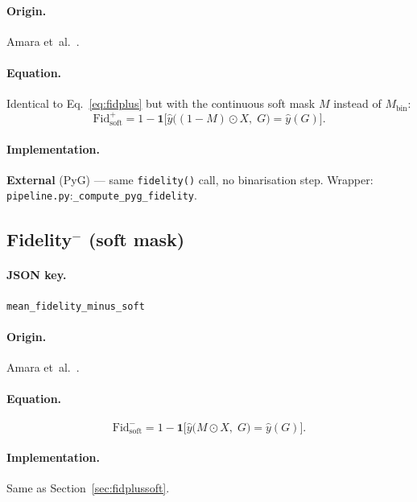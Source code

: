 \documentclass[11pt,a4paper]{article}
\newcommand{\code}[1]{\texttt{#1}}
\newcommand{\jsonkey}[1]{\texttt{#1}}
\begin{document}
\paragraph{Origin.} Amara et~al.~\cite{amara2022graphframex}.

\paragraph{Equation.}
Identical to Eq.~\eqref{eq:fidplus} but with the continuous soft mask $M$
instead of $M_{\mathrm{bin}}$:
\begin{equation}
  \mathrm{Fid}^{+}_{\mathrm{soft}} = 1 - \mathbf{1}\bigl[\hat{y}\bigl(
    (1 - M) \odot X,\; G\bigr) = \hat{y}(G)\bigr].
  \label{eq:fidplussoft}
\end{equation}

\paragraph{Implementation.} \textbf{External} (PyG) — same
\code{fidelity()} call, no binarisation step.  Wrapper:
\code{pipeline.py}:\code{\_compute\_pyg\_fidelity}.


\subsection{Fidelity\texorpdfstring{$^-$}{-} (soft mask)}
\label{sec:fidminussoft}

\paragraph{JSON key.} \jsonkey{mean\_fidelity\_minus\_soft}

\paragraph{Origin.} Amara et~al.~\cite{amara2022graphframex}.

\paragraph{Equation.}
\begin{equation}
  \mathrm{Fid}^{-}_{\mathrm{soft}} = 1 - \mathbf{1}\bigl[\hat{y}\bigl(
    M \odot X,\; G\bigr) = \hat{y}(G)\bigr].
  \label{eq:fidminussoft}
\end{equation}

\paragraph{Implementation.} Same as Section~\ref{sec:fidplussoft}.
\end{document}
